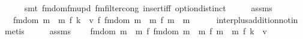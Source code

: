 \begin{isabellebody}
\ \ \ \ \isamarkupfalse%
\ {\isacharparenleft}{\kern0pt}smt\ fmdom{\isacharprime}{\kern0pt}{\isacharunderscore}{\kern0pt}fmupd\ fmfilter{\isacharunderscore}{\kern0pt}cong\ insert{\isacharunderscore}{\kern0pt}iff\ option{\isachardot}{\kern0pt}distinct{\isacharparenleft}{\kern0pt}{}{\isacharparenright}{\kern0pt}{\isacharparenright}{\kern0pt}\isanewline
\ \ \isamarkupfalse%
\ \isamarkupfalse%
\ assms\ \isamarkupfalse%
\ {\isachardoublequoteopen}{\isasymdots}\ {\isacharequal}{\kern0pt}\ fmdom{\isacharprime}{\kern0pt}\ m\ {\isasymlhd}{\isacharslash}{\kern0pt}\ m\ {\isacharplus}{\kern0pt}{\isacharplus}{\kern0pt}\isactrlsub f\ {\isacharbraceleft}{\kern0pt}k\ {\isachardollar}{\kern0pt}{\isachardollar}{\kern0pt}{\isacharcolon}{\kern0pt}{\isacharequal}{\kern0pt}\ v{\isacharbraceright}{\kern0pt}\ {\isacharplus}{\kern0pt}{\isacharplus}{\kern0pt}\isactrlsub f\ fmdom{\isacharprime}{\kern0pt}\ m\ {\isasymlhd}{\isacharslash}{\kern0pt}\ m\ {\isacharplus}{\kern0pt}{\isacharplus}{\kern0pt}\isactrlsub f\ {\isacharparenleft}{\kern0pt}m\ {\isasyminter}\isactrlsub {\isacharplus}{\kern0pt}\ m\isanewline
\ \ \ \ \isamarkupfalse%
\ inter{\isacharunderscore}{\kern0pt}plus{\isacharunderscore}{\kern0pt}addition{\isacharunderscore}{\kern0pt}notin\ \isamarkupfalse%
\ metis\isanewline
\ \ \isamarkupfalse%
\ \isamarkupfalse%
\ assms\ \isamarkupfalse%
\ {\isachardoublequoteopen}{\isasymdots}\ {\isacharequal}{\kern0pt}\ fmdom{\isacharprime}{\kern0pt}\ m\ {\isasymlhd}{\isacharslash}{\kern0pt}\ m\ {\isacharplus}{\kern0pt}{\isacharplus}{\kern0pt}\isactrlsub f\ fmdom{\isacharprime}{\kern0pt}\ m\ {\isasymlhd}{\isacharslash}{\kern0pt}\ m\ {\isacharplus}{\kern0pt}{\isacharplus}{\kern0pt}\isactrlsub f\ {\isacharparenleft}{\kern0pt}m\ {\isasyminter}\isactrlsub {\isacharplus}{\kern0pt}\ m\ {\isacharplus}{\kern0pt}{\isacharplus}{\kern0pt}\isactrlsub f\ {\isacharbraceleft}{\kern0pt}k\ {\isachardollar}{\kern0pt}{\isachardollar}{\kern0pt}{\isacharcolon}{\kern0pt}{\isacharequal}{\kern0pt}\ v{\isacharbraceright}{\kern0pt}{\isachardoublequoteclose}\isanewline

\end{isabellebody}
